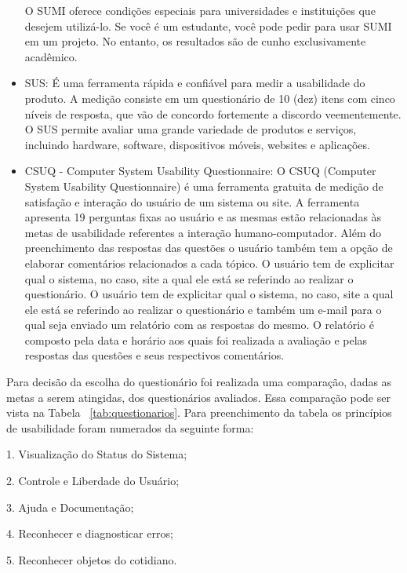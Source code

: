 \begin{itemize}
 O SUMI oferece condições especiais para universidades e instituições que desejem utilizá-lo. Se você é um estudante, você pode pedir para usar SUMI em um projeto. No entanto, os resultados são de cunho exclusivamente acadêmico.
 
 \item SUS: É uma ferramenta rápida e confiável para medir a usabilidade do produto. A medição consiste em um questionário de 10 (dez) itens com cinco níveis de resposta, 
 que vão de concordo fortemente a discordo veementemente. O SUS permite avaliar uma grande variedade de produtos e serviços, incluindo hardware, software, dispositivos 
 móveis, websites e aplicações.

 \item  CSUQ - Computer System Usability Questionnaire: O CSUQ (Computer System Usability Questionnaire) é uma ferramenta gratuita de medição de satisfação e interação do usuário de um sistema ou site. 
  A ferramenta apresenta 19 perguntas fixas ao usuário e as mesmas estão relacionadas às metas de usabilidade referentes a interação humano-computador.
  Além do preenchimento das respostas das questões o usuário também tem a opção de elaborar comentários relacionados a cada tópico. O usuário tem de explicitar qual 
  o sistema, no caso, site a qual ele está se referindo ao realizar o questionário. O usuário tem de explicitar qual o sistema, no caso, site a qual ele está se referindo 
  ao realizar o questionário e também um e-mail para o qual seja enviado um relatório com as respostas do mesmo. O relatório é composto pela data e horário aos quais foi 
  realizada a avaliação e pelas respostas das questões e seus respectivos comentários.
\end{itemize}
Para decisão da escolha do questionário foi realizada uma comparação, dadas as metas a serem atingidas, dos questionários avaliados. 
Essa comparação pode ser vista na Tabela ~\ref{tab:questionarios}. Para preenchimento da tabela os princípios de usabilidade foram numerados da seguinte forma:

1. Visualização do Status do Sistema;

2. Controle e Liberdade do Usuário;

3. Ajuda e Documentação;

4. Reconhecer e diagnosticar erros;

5. Reconhecer objetos do cotidiano.


